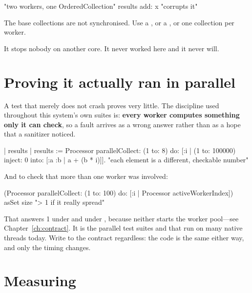 \begin{stwarn}
\begin{st}
"two workers, one OrderedCollection"
results add: x                            "corrupts it"
\end{st}
The base collections are not synchronised. Use a , or a
, or one collection per worker.
\end{stwarn}

\begin{stwarn}
It stops nobody on another core. It never worked here and it never will.
\end{stwarn}

\section{Proving it actually ran in parallel}

A test that merely does not crash proves very little. The discipline used
throughout this system's own suites is: \textbf{every worker computes something
only it can check}, so a fault arrives as a wrong answer rather than as a hope
that a sanitizer noticed.

\begin{st}
| results |
results := Processor parallelCollect: (1 to: 8) do: [:i |
    (1 to: 100000) inject: 0 into: [:a :b | a + (b * i)]].
"each element is a different, checkable number"
\end{st}

And to check that more than one worker was involved:

\begin{st}
(Processor parallelCollect: (1 to: 100) do: [:i | Processor activeWorkerIndex])
    asSet size                            "> 1 if it really spread"
\end{st}

\begin{stwarn}
That answers 1 under  and under , because
neither starts the worker pool---see Chapter~\ref{ch:contract}. It is the
parallel test suites and  that run on many native threads
today. Write to the contract regardless: the code is the same either way, and
only the timing changes.
\end{stwarn}

\section{Measuring}

